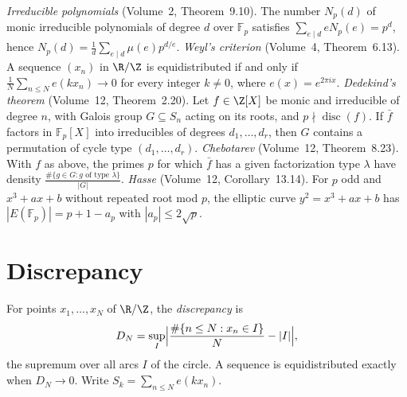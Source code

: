 \begin{reminder}
\emph{Irreducible polynomials} (Volume~2, Theorem~9.10). The number $N_p(d)$ of monic irreducible polynomials of degree $d$ over $\mathbb F_p$ satisfies $\sum_{e\mid d}eN_p(e)=p^d$, hence $N_p(d)=\frac1d\sum_{e\mid d}\mu(e)p^{d/e}$.
\emph{Weyl's criterion} (Volume~4, Theorem~6.13). A sequence $(x_n)$ in $\R/\Z$ is equidistributed if and only if $\frac1N\sum_{n\le N}e(kx_n)\to0$ for every integer $k\ne0$, where $e(x)=e^{2\pi ix}$.
\emph{Dedekind's theorem} (Volume~12, Theorem~2.20). Let $f\in\Z[X]$ be monic and irreducible of degree $n$, with Galois group $G\subseteq S_n$ acting on its roots, and $p\nmid\operatorname{disc}(f)$. If $\bar f$ factors in $\mathbb F_p[X]$ into irreducibles of degrees $d_1,\dots,d_r$, then $G$ contains a permutation of cycle type $(d_1,\dots,d_r)$.
\emph{Chebotarev} (Volume~12, Theorem~8.23). With $f$ as above, the primes $p$ for which $\bar f$ has a given factorization type $\lambda$ have density $\frac{\#\{g\in G:g\text{ of type }\lambda\}}{|G|}$.
\emph{Hasse} (Volume~12, Corollary~13.14). For $p$ odd and $x^3+ax+b$ without repeated root mod $p$, the elliptic curve $y^2=x^3+ax+b$ has $|E(\mathbb F_p)|=p+1-a_p$ with $|a_p|\le2\sqrt p$.
\end{reminder}

\section{Discrepancy}

For points $x_1,\dots,x_N$ of $\R/\Z$, the \emph{discrepancy} is
\[
D_N=\sup_I\Bigl|\frac{\#\{n\le N:x_n\in I\}}N-|I|\Bigr|,
\]
the supremum over all arcs $I$ of the circle. A sequence is equidistributed exactly when $D_N\to0$. Write $S_k=\sum_{n\le N}e(kx_n)$.

